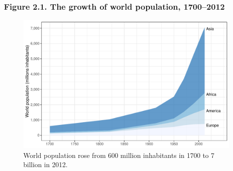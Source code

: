 \documentclass[t]{beamer}\usepackage[]{graphicx}\usepackage[]{color}
\newenvironment{knitrout}{}{} %
\begin{document}
\begin{frame}[label=Figure_2_1]
\frametitle{Figure 2.1. The growth of world population, 1700--2012}
\begin{figure}[t]
\begin{minipage}[b]{\textwidth}
\centering
\begin{knitrout}\footnotesize
{}\color{fgcolor}

{\centering \includegraphics[width=1\linewidth]{figures/color/Figure_2_1} 

}



\end{knitrout}
\caption{World population rose from 600 million inhabitants in 1700 to 7 billion in 2012.}
\end{minipage}
\end{figure}
\end{frame}
\end{document}
